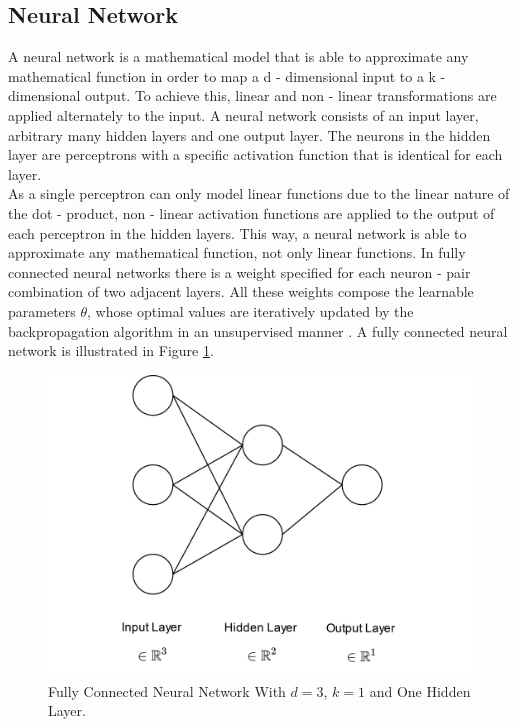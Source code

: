 \subsection{Neural Network}
A neural network is a mathematical model that is able to approximate any mathematical function in order to map a d - dimensional input to a k - dimensional output. To achieve this, linear and non - linear transformations are applied alternately to the input. A neural network consists of an input layer, arbitrary many hidden layers and one output layer. The neurons in the hidden layer are perceptrons with a specific activation function that is identical for each layer.\\
As a single perceptron can only model linear functions due to the linear nature of the dot - product, non - linear activation functions are applied to the output of each perceptron in the hidden layers. This way, a neural network is able to approximate any mathematical function, not only linear functions. In fully connected neural networks there is a weight specified for each neuron - pair combination of two adjacent layers. All these weights compose the learnable parameters $\theta$, whose optimal values are iteratively updated by the backpropagation algorithm in an unsupervised manner \cite{rumelhart1986learning}. A fully connected neural network is illustrated in Figure \ref{fig:nn}.

\begin{figure}[ht]
    \centering
    \includegraphics[width=1\textwidth]{images/nn.jpg}
    \caption{Fully Connected Neural Network With $d=3$, $k=1$ and One Hidden Layer.}
    \label{fig:nn}
\end{figure}

